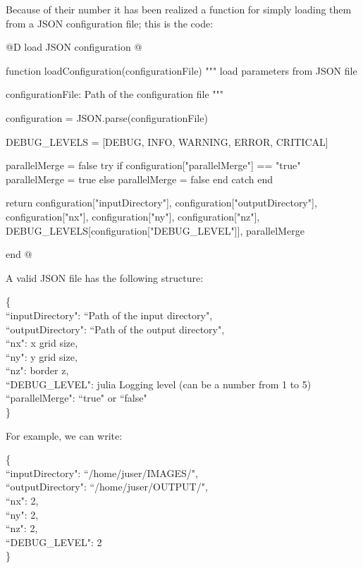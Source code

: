\documentclass[11pt,oneside]{article}	%
\begin{document}
Because of their number it has been realized a function for simply loading them from a JSON configuration file; this is the code:

@D load JSON configuration
@{function loadConfiguration(configurationFile)
  """
  load parameters from JSON file

  configurationFile: Path of the configuration file
  """

  configuration = JSON.parse(configurationFile)

  DEBUG_LEVELS = [DEBUG, INFO, WARNING, ERROR, CRITICAL]

  parallelMerge = false
  try
    if configuration["parallelMerge"] == "true"
      parallelMerge = true
    else
      parallelMerge = false
    end
  catch
  end
   
  return configuration["inputDirectory"], configuration["outputDirectory"],
        configuration["nx"], configuration["ny"], configuration["nz"],
        DEBUG_LEVELS[configuration["DEBUG_LEVEL"]],
        parallelMerge

end
@}

A valid JSON file has the following structure:
\begin{tabbing}
\{ \= \\
\>  ``inputDirectory": ``Path of the input directory",\\
\>  ``outputDirectory": ``Path of the output directory",\\
\>  ``nx": x grid size,\\
\>  ``ny": y grid size,\\
\>  ``nz": border z,\\
\>  ``DEBUG\_LEVEL": julia Logging level (can be a number from 1 to 5)\\
\>  ``parallelMerge": ``true" or ``false" \\
\}\\
\end{tabbing}

For example, we can write:

\begin{tabbing}
\{ \= \\
\>  ``inputDirectory": ``/home/juser/IMAGES/",\\
\>  ``outputDirectory": ``/home/juser/OUTPUT/",\\
\>  ``nx": 2,\\
\>  ``ny": 2,\\
\>  ``nz": 2,\\
\>  ``DEBUG\_LEVEL": 2\\
\}\\
\end{tabbing}
\end{document}
